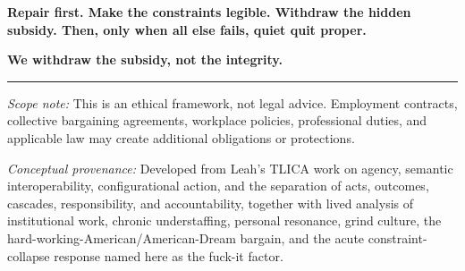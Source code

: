 \documentclass[11pt,oneside]{article}
\begin{document}
\textbf{Repair first. Make the constraints legible. Withdraw the hidden
subsidy. Then, only when all else fails, quiet quit proper.}

\textbf{We withdraw the subsidy, not the integrity.}

\begin{center}\rule{0.5\linewidth}{0.5pt}\end{center}

\emph{Scope note:} This is an ethical framework, not legal advice.
Employment contracts, collective bargaining agreements, workplace
policies, professional duties, and applicable law may create additional
obligations or protections.

\emph{Conceptual provenance:} Developed from Leah's TLICA work on
agency, semantic interoperability, configurational action, and the
separation of acts, outcomes, cascades, responsibility, and
accountability, together with lived analysis of institutional work,
chronic understaffing, personal resonance, grind culture, the
hard-working-American/American-Dream bargain, and the acute
constraint-collapse response named here as the fuck-it factor.
\end{document}
